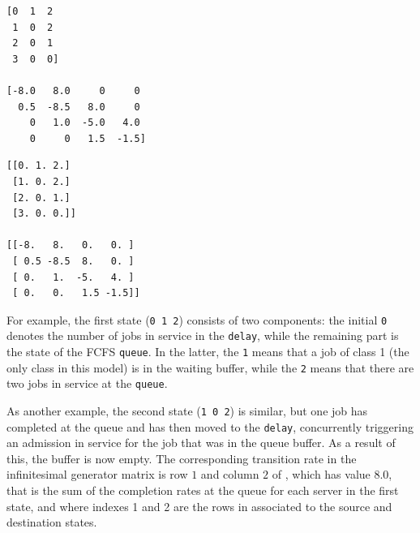 \begin{KOTLIN}
\begin{lstlisting}[basicstyle=\ttfamily\scriptsize]
[0  1  2 
 1  0  2 
 2  0  1 
 3  0  0]

[-8.0   8.0     0     0 
  0.5  -8.5   8.0     0 
    0   1.0  -5.0   4.0 
    0     0   1.5  -1.5]
\end{lstlisting}
\end{KOTLIN}
\begin{PYTHON}
\begin{lstlisting}[basicstyle=\ttfamily\scriptsize]
[[0. 1. 2.]
 [1. 0. 2.]
 [2. 0. 1.]
 [3. 0. 0.]]

[[-8.   8.   0.   0. ]
 [ 0.5 -8.5  8.   0. ]
 [ 0.   1.  -5.   4. ]
 [ 0.   0.   1.5 -1.5]]
\end{lstlisting}
\end{PYTHON}
For example, the first state (\texttt{0 1 2}) consists of two components: the initial \texttt{0} denotes the number of jobs in service in the \texttt{delay}, while the remaining part is the state of the FCFS \texttt{queue}. In the latter, the \texttt{1} means that a job of class 1 (the only class in this model) is in the waiting buffer, while the \texttt{2} means that there are two jobs in service at the \texttt{queue}.

As another example, the second state (\texttt{1 0 2}) is similar, but one job has completed at the {queue} and has then moved to the \texttt{delay}, concurrently triggering an admission in service for the job that was in the queue buffer. As a result of this, the buffer is now empty. The corresponding transition rate in the infinitesimal generator matrix is  row $1$ and column $2$ of , which has value $8.0$, that is the sum of the completion rates at the queue for each server in the first state, and where indexes 1 and 2 are the rows in  associated to the source and destination states.

